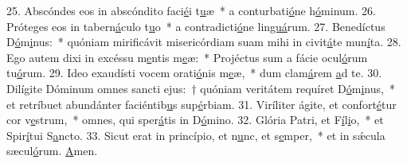 25. Abscóndes eos in abscóndito faci\uline{é}i t\uline{u}æ~* a conturbati\uline{ó}ne h\uline{ó}minum.
26. Próteges eos in tabern\uline{á}culo t\uline{u}o~* a contradicti\uline{ó}ne lin\uline{guá}rum.
27. Benedíctus D\uline{ó}m\uline{i}nus:~* quóniam mirificávit misericórdiam suam mihi in civit\uline{á}te mun\uline{í}ta.
28. Ego autem dixi in excéssu m\uline{e}ntis m\uline{e}æ:~* Projéctus sum a fácie ocul\uline{ó}rum tu\uline{ó}rum.
29. Ideo exaudísti vocem orati\uline{ó}nis m\uline{e}æ,~* dum clam\uline{á}rem \uline{a}d te.
30. Dilígite Dóminum omnes sancti ejus:~† quóniam veritátem requíret D\uline{ó}m\uline{i}nus,~* et retríbuet abundánter faciéntib\uline{u}s sup\uline{é}rbiam.
31. Viríliter ágite, et confort\uline{é}tur cor v\uline{e}strum,~* omnes, qui sper\uline{á}tis in D\uline{ó}mino.
32. Glória Patri, et F\uline{í}l\uline{i}o,~* et Spir\uline{í}tui S\uline{a}ncto.
33. Sicut erat in princípio, et n\uline{u}nc, et s\uline{e}mper,~* et in sǽcula sæcul\uline{ó}rum. \uline{A}men.
